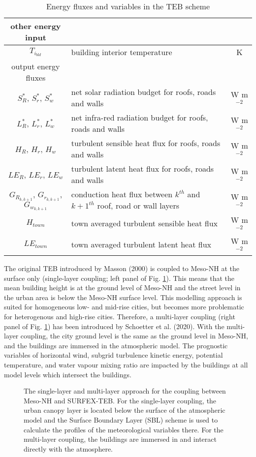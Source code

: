 \begin{table}[h]
{{\begin{tabular}{||c |l |c||}
\hline
other energy input && \\
\hline
$T_{i_{bld}}$  & building interior temperature & K \\
\hline
output energy fluxes && \\
\hline
$S^*_R$, $S^*_r$, $S^*_w$ & net solar radiation budget for roofs, roads and walls & W m$^{-2}$ \\
$L^*_R$, $L^*_r$, $L^*_w$ & net infra-red radiation budget for roofs, roads and walls & W m$^{-2}$ \\
$H_R$, $H_r$, $H_w$ & turbulent sensible heat flux for roofs, roads and walls & W m$^{-2}$ \\
$LE_R$, $LE_r$, $LE_w$ & turbulent latent heat flux for roofs, roads and walls & W m$^{-2}$ \\
$G_{R_{k,k+1}}$, $G_{r_{k,k+1}}$, $G_{w_{k,k+1}}$ & conduction heat flux between $k^{th}$ and $k+1^{th}$ roof,
 road or wall layers & W m$^{-2}$ \\
$H_{town}$ & town averaged turbulent sensible heat flux & W m$^{-2}$ \\
$LE_{town}$ & town averaged turbulent latent heat flux & W m$^{-2}$ \\
\hline
\hline
\end{tabular}
}}
\caption{Energy fluxes and variables in the TEB scheme}
\label{TEB1}
\end{table}
%
The original TEB introduced by Masson (2000) is coupled to Meso-NH at the surface only (single-layer coupling;
left panel of Fig. \ref{fig:coupling_methods}). This means that the mean building height is at the ground
level of Meso-NH and the street level in the urban area is below the Meso-NH surface level. This modelling approach is
suited for homogeneous low- and mid-rise cities, but becomes more problematic for heterogenous
and high-rise cities. Therefore, a multi-layer coupling (right panel of Fig. \ref{fig:coupling_methods})
has been introduced by Schoetter et al. (2020). With the multi-layer coupling, the city ground level is
the same as the ground level in Meso-NH, and the buildings are immersed in the atmospheric model.
The prognostic variables of horizontal wind, subgrid turbulence kinetic energy, potential temperature,
and water vapour mixing ratio are impacted by the buildings at all model levels which intersect the buildings. \\
%
\begin{figure}[t]
\hspace*{0.cm}
\caption{The single-layer and multi-layer approach for the coupling between Meso-NH and SURFEX-TEB.
For the single-layer coupling, the urban canopy layer is located below the surface of the atmospheric model
and the Surface Boundary Layer (SBL) scheme is used to calculate the profiles of the meteorological variables
there. For the multi-layer coupling, the buildings are immersed in and interact directly with the atmosphere.}
\label{fig:coupling_methods}
\end{figure}
